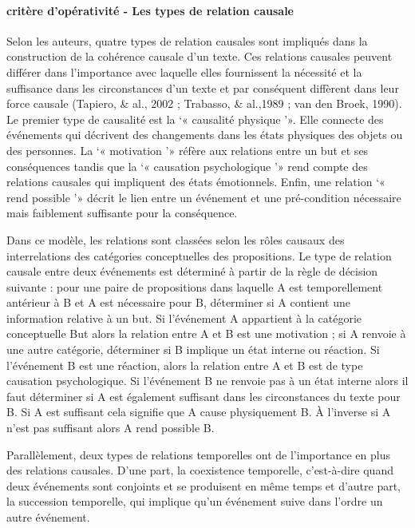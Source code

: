 \paragraph{critère d'opérativité - Les types de relation causale} 
Selon les auteurs, quatre types de relation causales sont impliqués dans la construction de la cohérence causale d’un texte. Ces relations causales peuvent différer dans l’importance avec laquelle elles fournissent la nécessité et la suffisance dans les circonstances d’un texte et par conséquent diffèrent dans leur force causale (Tapiero, & al., 2002 ; Trabasso, & al.,1989 ; van den Broek, 1990). Le premier type de causalité est la ‘« causalité physique ’». Elle connecte des événements qui décrivent des changements dans les états physiques des objets ou des personnes. La ‘« motivation ’» réfère aux relations entre un but et ses conséquences tandis que la ‘« causation psychologique ’» rend compte des relations causales qui impliquent des états émotionnels. Enfin, une relation ‘« rend possible ’» décrit le lien entre un événement et une pré-condition nécessaire mais faiblement suffisante pour la conséquence.

Dans ce modèle, les relations sont classées selon les rôles causaux des interrelations des catégories conceptuelles des propositions. Le type de relation causale entre deux événements est déterminé à partir de la règle de décision suivante : pour une paire de propositions dans laquelle A est temporellement antérieur à B et A est nécessaire pour B, déterminer si A contient une information relative à un but. Si l’événement A appartient à la catégorie conceptuelle But alors la relation entre A et B est une motivation ; si A renvoie à une autre catégorie, déterminer si B implique un état interne ou réaction. Si l’événement B est une réaction, alors la relation entre A et B est de type causation psychologique. Si l’événement B ne renvoie pas à un état interne alors il faut déterminer si A est également suffisant dans les circonstances du texte pour B. Si A est suffisant cela signifie que A cause physiquement B. À l’inverse si A n’est pas suffisant alors A rend possible B.

Parallèlement, deux types de relations temporelles ont de l’importance en plus des relations causales. D’une part, la coexistence temporelle, c’est-à-dire quand deux événements sont conjoints et se produisent en même temps et d’autre part, la succession temporelle, qui implique qu’un événement suive dans l’ordre un autre événement.

